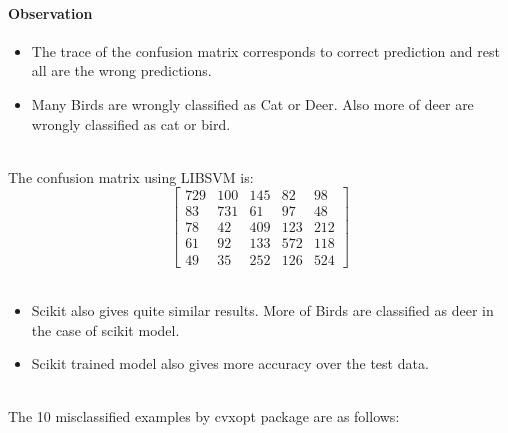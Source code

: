 \documentclass[11pt]{article}
\begin{document}
\paragraph{Observation}
\begin{itemize}
    \item The trace of the confusion matrix corresponds to correct prediction and rest all are the wrong predictions.
    \item Many Birds are wrongly classified as Cat or Deer. Also more of deer are wrongly classified as cat or bird.
\end{itemize}
\\
The confusion matrix using LIBSVM is:
\begin{equation}
  \begin{bmatrix}
    729 & 100 & 145 & 82 & 98\\
    83 & 731 & 61 & 97 & 48\\
    78 & 42 & 409 & 123 & 212\\
    61 & 92 & 133 & 572 & 118\\
    49 & 35 & 252 & 126 & 524
  \end{bmatrix}
\end{equation}
\\
\begin{itemize}
    \item Scikit also gives quite similar results. More of Birds are classified as deer in the case of scikit model.
    \item Scikit trained model also gives more accuracy over the test data.
\end{itemize}
\\
\newpage
The 10 misclassified examples by cvxopt package are as follows:
\end{document}
